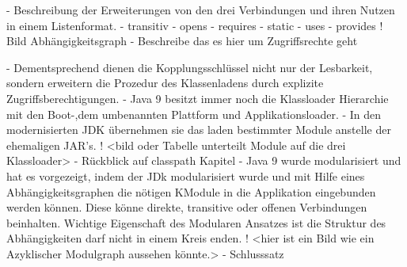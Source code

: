   - Beschreibung der Erweiterungen von den drei Verbindungen und ihren Nutzen in einem Listenformat.
  - transitiv
  - opens
  - requires
  - static
  - uses
  - provides
! Bild Abhängigkeitsgraph
-  Beschreibe das es hier um Zugriffsrechte geht 

- Dementsprechend dienen die Kopplungsschlüssel nicht nur der Lesbarkeit, sondern erweitern die Prozedur des Klassenladens durch explizite Zugriffsberechtigungen. 
- Java 9 besitzt immer noch die Klassloader Hierarchie mit den Boot-,dem umbenannten Plattform und Applikationsloader.
- In den modernisierten JDK  übernehmen sie das laden bestimmter Module anstelle der ehemaligen JAR's.
!  <bild oder Tabelle unterteilt Module auf die drei  Klassloader> 
- Rückblick auf classpath Kapitel 
- Java 9 wurde modularisiert und hat es vorgezeigt, indem der JDk modularisiert wurde und mit Hilfe eines Abhängigkeitsgraphen  die nötigen KModule in die Applikation eingebunden werden können. Diese könne direkte, transitive oder offenen Verbindungen beinhalten. Wichtige Eigenschaft des Modularen Ansatzes ist die Struktur des Abhängigkeiten darf nicht in einem Kreis enden.
! <hier ist ein Bild wie ein Azyklischer Modulgraph aussehen könnte.> 
- Schlusssatz 